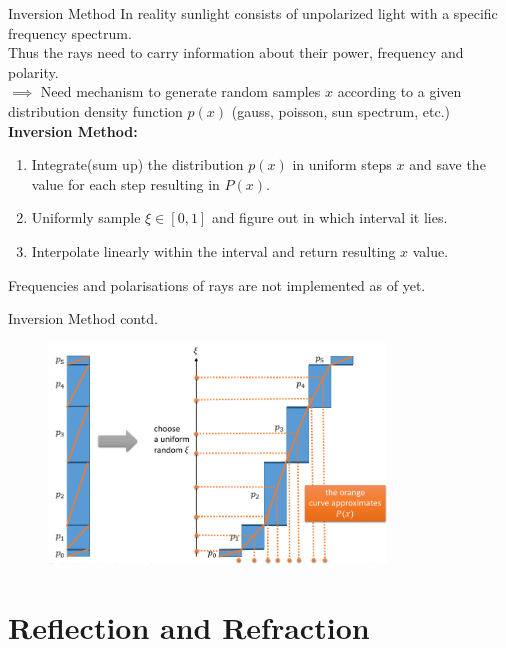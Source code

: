 \documentclass[aspectratio=43,t]{beamer}
\begin{document}
		\begin{frame}[fragile]{Inversion Method}
		In reality sunlight consists of unpolarized light with a specific frequency spectrum.\\
		Thus the rays need to carry information about their power, frequency and polarity.\\
		\bigskip
		$\implies$ Need mechanism to generate random samples $x$ according to 
			a given distribution density function $p(x)$ (gauss, poisson, sun spectrum, etc.)\\
		\bigskip
			\textbf{Inversion Method:}\\
      \begin{enumerate}
				\item<2-> Integrate(sum up) the distribution $p(x)$ in uniform steps $x$ and save
					the value for each step resulting in $P(x)$.
				\item<3-> Uniformly sample $\xi \in [0,1]$ and figure out in which interval it lies.
        \item<4-> Interpolate linearly within the interval and return resulting $x$ value.
      \end{enumerate}

		\bigskip
		\bigskip
		Frequencies and polarisations of rays are not implemented as of yet.
    \end{frame}

		\begin{frame}[fragile]{Inversion Method contd.}
		\begin{figure}
		\centering
		\includegraphics[width=0.8\textwidth]{images/inversion.png}
		\end{figure}
    \end{frame}

	\section{Reflection and Refraction}
\end{document}
